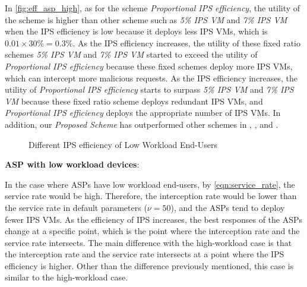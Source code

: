 \documentclass[10pt,journal, compsoc]{IEEEtran}
\begin{document}
In \cref{fig:eff_asp_high}, as for the scheme \textit{Proportional IPS efficiency}, the utility of the scheme is higher than other scheme such as \textit{5\% IPS VM} and \textit{7\% IPS VM} when the IPS efficiency is low because it deploys less IPS VMs, which is $0.01 \times 30\% = 0.3\%$. As the IPS efficiency increases, the utility of these fixed ratio schemes \textit{5\% IPS VM} and \textit{7\% IPS VM} started to exceed the utility of \textit{Proportional IPS efficiency} because these fixed schemes deploy more IPS VMs, which can intercept more malicious requests. As the IPS efficiency increases, the utility of \textit{Proportional IPS efficiency} starts to surpass \textit{5\% IPS VM} and \textit{7\% IPS VM} because these fixed ratio scheme deploys redundant IPS VMs, and \textit{Proportional IPS efficiency} deploys the appropriate number of IPS VMs. In addition, our \textit{Proposed Scheme} has outperformed other schemes in , , and .

\begin{figure}[!]
\captionsetup{justification=centering}
  \hfill
  \hfill
\label{fig:eff_low}
\caption{Different IPS efficiency of Low Workload End-Users}
\end{figure}

\textbf{ASP with low workload devices}:

In the case where ASPs have low workload end-users, by \cref{eqn:service_rate}, the service rate would be high. Therefore, the interception rate would be lower than the service rate in default parameters ($\nu = 50$), and the ASPs tend to deploy fewer IPS VMs. As the efficiency of IPS increases, the best responses of the ASPs change at a specific point, which is the point where the interception rate and the service rate intersects. The main difference with the high-workload case is that the interception rate and the service rate intersects at a point where the IPS efficiency is higher. Other than the difference previously mentioned, this case is similar to the high-workload case.
\end{document}
